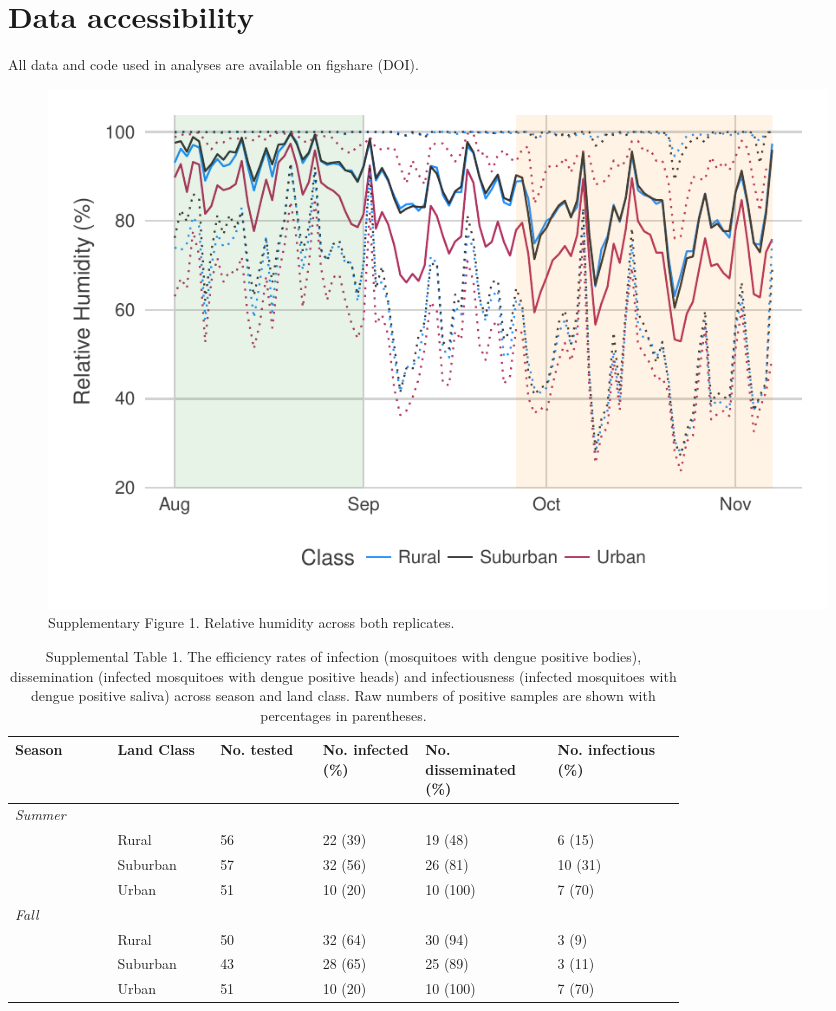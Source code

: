 \documentclass[12pt]{article}
\begin{document}
\section{Data accessibility}
All data and code used in analyses are available on figshare (DOI).

\newpage
\begin{figure}
\centering\includegraphics[width=0.9\linewidth]{relativeHumidity.pdf}
\caption{Supplementary Figure 1. Relative humidity across both replicates.}
\end{figure}

\begin{table}
\centering
\begin{tabular}{P{0.12\linewidth}P{0.12\linewidth}P{0.12\linewidth}P{0.12\linewidth}P{0.15\linewidth}P{0.15\linewidth}}
\hline
\textbf{Season} & \textbf{Land Class} & \textbf{No. tested} & \textbf{No. infected (\%)}  & \textbf{No. disseminated (\%)} & \textbf{No. infectious (\%)} \\
\hline
\hline
\textit{Summer} &   &   &   &   \\
  		& Rural & 56 & 22 (39) & 19 (48) & 6 (15) \\
		& Suburban & 57 & 32 (56) & 26 (81) & 10 (31) \\
		& Urban & 51 & 10 (20) & 10 (100) & 7 (70) \\

\textit{Fall} &   &   &   &   \\
  		& Rural & 50 & 32 (64) & 30 (94) & 3 (9) \\
		& Suburban & 43 & 28 (65) & 25 (89) & 3 (11) \\
		& Urban & 51 & 10 (20) & 10 (100) & 7 (70) \\
\hline
\end{tabular}
\caption{Supplemental Table 1. The efficiency rates of infection (mosquitoes with dengue positive bodies), dissemination (infected mosquitoes with dengue positive heads) and infectiousness (infected mosquitoes with dengue positive saliva) across season and land class. Raw numbers of positive samples are shown with percentages in parentheses.}
\end{table}
\end{document}
